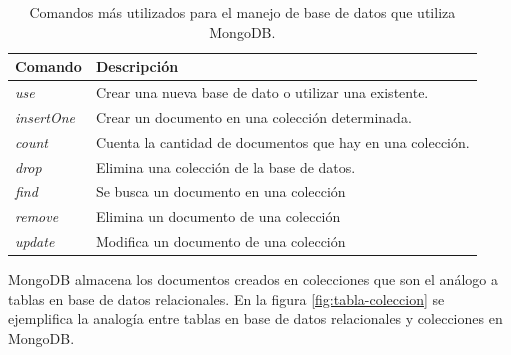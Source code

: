 \begin{table}[h]
	\centering
	\caption[Comandos utilizados en MongoDB]{Comandos más utilizados para el manejo de base de datos que utiliza MongoDB.}
	\begin{tabular}{l l }    
		\toprule
		\textbf{Comando} 	 & \textbf{Descripción} 		\\
		\midrule
	
		\textit{use} 							& Crear una nueva base de dato o utilizar una existente.\\		
		\textit{insertOne}					& Crear un documento en una colección determinada.\\	
		\textit{count}						& Cuenta la cantidad de documentos que hay en una colección.\\	
		\textit{drop}							& Elimina una colección de la base de datos.\\	
		\textit{find	} 						& Se busca un documento en una colección\\
		\textit{remove}	 					& Elimina un documento de una colección\\
		\textit{update}						& Modifica un documento de una colección\\
		
		\bottomrule
		\hline
	\end{tabular}
	\label{tab:mongo-commands}
\end{table}

MongoDB almacena los documentos creados en colecciones que son el análogo a tablas en base de datos relacionales.  En la figura \ref{fig:tabla-coleccion} se ejemplifica la analogía entre tablas en base de datos relacionales y colecciones en MongoDB.

